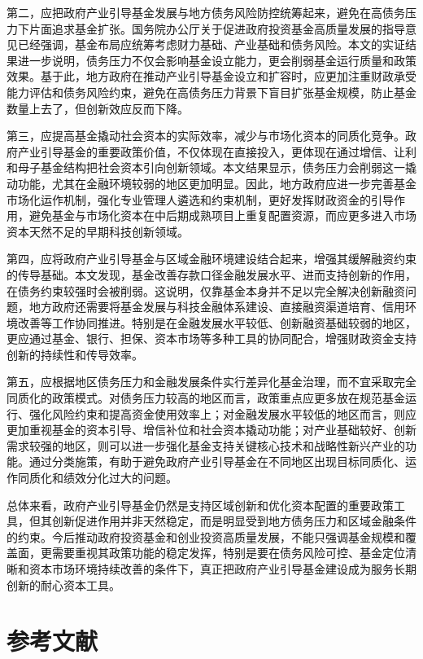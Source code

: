 \documentclass[UTF8,a4paper,zihao=5,fontset=fandol]{ctexart}
\begin{document}
第二，应把政府产业引导基金发展与地方债务风险防控统筹起来，避免在高债务压力下片面追求基金扩张。国务院办公厅关于促进政府投资基金高质量发展的指导意见已经强调，基金布局应统筹考虑财力基础、产业基础和债务风险。本文的实证结果进一步说明，债务压力不仅会影响基金设立能力，更会削弱基金运行质量和政策效果。基于此，地方政府在推动产业引导基金设立和扩容时，应更加注重财政承受能力评估和债务风险约束，避免在高债务压力背景下盲目扩张基金规模，防止基金数量上去了，但创新效应反而下降。

第三，应提高基金撬动社会资本的实际效率，减少与市场化资本的同质化竞争。政府产业引导基金的重要政策价值，不仅体现在直接投入，更体现在通过增信、让利和母子基金结构把社会资本引向创新领域。本文结果显示，债务压力会削弱这一撬动功能，尤其在金融环境较弱的地区更加明显。因此，地方政府应进一步完善基金市场化运作机制，强化专业管理人遴选和约束机制，更好发挥财政资金的引导作用，避免基金与市场化资本在中后期成熟项目上重复配置资源，而应更多进入市场资本天然不足的早期科技创新领域。

第四，应将政府产业引导基金与区域金融环境建设结合起来，增强其缓解融资约束的传导基础。本文发现，基金改善存款口径金融发展水平、进而支持创新的作用，在债务约束较强时会被削弱。这说明，仅靠基金本身并不足以完全解决创新融资问题，地方政府还需要将基金发展与科技金融体系建设、直接融资渠道培育、信用环境改善等工作协同推进。特别是在金融发展水平较低、创新融资基础较弱的地区，更应通过基金、银行、担保、资本市场等多种工具的协同配合，增强财政资金支持创新的持续性和传导效率。

第五，应根据地区债务压力和金融发展条件实行差异化基金治理，而不宜采取完全同质化的政策模式。对债务压力较高的地区而言，政策重点应更多放在规范基金运行、强化风险约束和提高资金使用效率上；对金融发展水平较低的地区而言，则应更加重视基金的资本引导、增信补位和社会资本撬动功能；对产业基础较好、创新需求较强的地区，则可以进一步强化基金支持关键核心技术和战略性新兴产业的功能。通过分类施策，有助于避免政府产业引导基金在不同地区出现目标同质化、运作同质化和绩效分化过大的问题。

总体来看，政府产业引导基金仍然是支持区域创新和优化资本配置的重要政策工具，但其创新促进作用并非天然稳定，而是明显受到地方债务压力和区域金融条件的约束。今后推动政府投资基金和创业投资高质量发展，不能只强调基金规模和覆盖面，更需要重视其政策功能的稳定发挥，特别是要在债务风险可控、基金定位清晰和资本市场环境持续改善的条件下，真正把政府产业引导基金建设成为服务长期创新的耐心资本工具。


\section*{参考文献}
\end{document}
